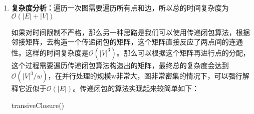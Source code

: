 \documentclass[12pt,a4paper]{article}
\makeatletter
\newtheorem*{solution}{Solution}
\theoremstyle{definition}
\renewenvironment{solution}[1][Solution] {\par\pushQED{\qed}\normalfont\topsep6\p@\@plus6\p@\relax\trivlist\item[\hskip\labelsep\bfseries#1\@addpunct{.}]\ignorespaces}{\popQED\endtrivlist\@endpefalse} \makeatother
\makeatother
\begin{document}
\begin{enumerate}
\begin{solution}
	\textbf{复杂度分析：}遍历一次图需要遍历所有点和边，所以总的时间复杂度为$\mathcal{O}(|E|+|V|)$
	
	如果对时间限制不严格，那么另一种思路是我们可以使用传递闭包算法，根据邻接矩阵，去构造一个传递闭包的矩阵，这个矩阵直接反应了两点间的连通性。这样的时间复杂度是$\mathcal{O}(|V|^3)$。那么可以根据这个矩阵再进行点的分配，这个过程需要遍历传递闭包算法构造出的矩阵，最终总的复杂度会达到$\mathcal{O}(|V|^3/w)$，在并行处理的规模w非常大，图非常密集的情况下，可以强行解释它近似于$\mathcal{O}(|E|)$。传递闭包的算法实现起来较简单如下：
	\begin{center}
		\begin{algorithm}[H]
			\caption{transiveClosure()}
		\end{algorithm}
	\end{center}
\end{solution}


\end{enumerate}
\end{document}
